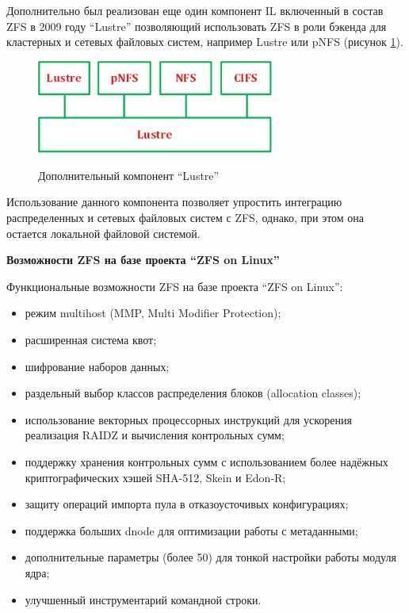 \documentclass[10pt, a5paper]{article}
\begin{document}
Дополнительно был реализован еще один компонент IL включенный в состав ZFS в 2009 году ``Lustre'' позволяющий использовать ZFS в роли бэкенда для кластерных и сетевых файловых систем, например Lustre или pNFS (рисунок \ref{xx:klyga:fig2}).

\begin{center}
\begin{figure}[h!]
  \centering
  \includegraphics[width=8cm]{xx_klyga_zfs_lustre}
  \caption{Дополнительный компонент ``Lustre''}
  \label{xx:klyga:fig2}
\end{figure}
\end{center}

Использование данного компонента позволяет упростить интеграцию распределенных и сетевых файловых систем с ZFS, однако, при этом она остается локальной файловой системой.

\textbf{Возможности ZFS на базе проекта ``ZFS on Linux''}

Функциональные возможности ZFS на базе проекта “ZFS on Linux”:

\begin{itemize}
  \item режим multihost (MMP, Multi Modifier Protection);
  \item расширенная система квот;
  \item шифрование наборов данных;
  \item раздельный выбор классов распределения блоков (allocation classes);
  \item использование векторных процессорных инструкций для ускорения реализация RAIDZ и вычисления контрольных сумм;
  \item поддержку хранения контрольных сумм с использованием более надёжных криптографических хэшей SHA-512, Skein и Edon-R;
  \item защиту операций импорта пула в отказоусточивых конфигурациях;
  \item поддержка больших dnode для оптимизации работы с метаданными;
  \item дополнительные параметры (более 50) для тонкой настройки работы модуля ядра;
  \item улучшенный инструментарий командной строки.
\end{itemize}
\end{document}
